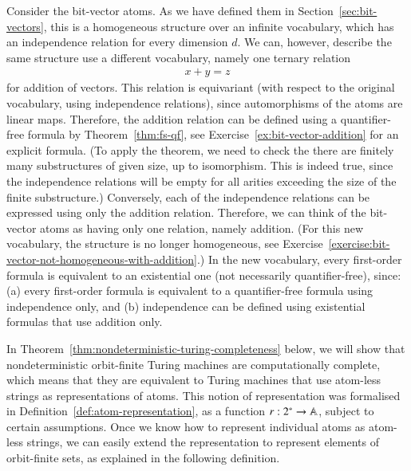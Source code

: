 \begin{myexample}\label{ex:bit-vector-addition-relation}
	Consider the bit-vector atoms. As we have defined them in Section~\ref{sec:bit-vectors}, this is a homogeneous structure over an infinite vocabulary, which has an  independence relation for every dimension $d$. We can, however, describe the same structure use a different vocabulary, namely one ternary relation  
	\begin{align*}
	x + y  = z
	\end{align*}
	for addition of vectors. This relation is equivariant (with respect to the original vocabulary, using independence relations), since automorphisms of the atoms are linear maps. Therefore, the addition relation  can be defined using a quantifier-free formula by Theorem~\ref{thm:fs-qf}, see Exercise~\ref{ex:bit-vector-addition} for an explicit formula. (To apply the theorem, we need to check the there are finitely many substructures of given size, up to isomorphism. This is indeed true, since the independence relations will be empty for all arities exceeding the size of the finite substructure.) Conversely, each of the independence relations can be expressed using  only the addition relation. Therefore, we can think of the bit-vector atoms as having only one relation, namely addition. (For this new vocabulary, the structure is no longer homogeneous, see Exercise~\ref{exercise:bit-vector-not-homogeneous-with-addition}.) In the new vocabulary, every first-order formula is equivalent to an existential one (not necessarily quantifier-free), since: (a) every first-order formula is equivalent to a  quantifier-free formula using independence only, and (b) independence can be defined using existential formulas that use addition only. 
\end{myexample}




In Theorem~\ref{thm:nondeterministic-turing-completeness} below, we will show that nondeterministic orbit-finite Turing machines are computationally complete, which means that they are equivalent to Turing machines that use atom-less strings as representations of atoms. This notion of representation was formalised in  Definition~\ref{def:atom-representation}, as a function $r : 2^* \to \mathbb A$, subject to certain assumptions. Once we know how to represent individual atoms as atom-less strings, we can easily extend the representation to   represent  elements of  orbit-finite sets, as explained in the following definition.

